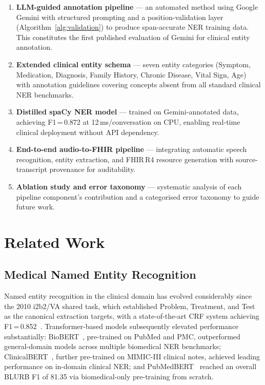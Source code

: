 \documentclass[conference]{IEEEtran}
\begin{document}
\begin{enumerate}
  \item \textbf{LLM-guided annotation pipeline} — an automated method using
  Google Gemini with structured prompting and a position-validation layer
  (Algorithm~\ref{alg:validation}) to produce span-accurate NER training data.
  This constitutes the first published evaluation of Gemini for clinical entity
  annotation.

  \item \textbf{Extended clinical entity schema} — seven entity categories
  (Symptom, Medication, Diagnosis, Family History, Chronic Disease, Vital Sign,
  Age) with annotation guidelines covering concepts absent from all standard
  clinical NER benchmarks.

  \item \textbf{Distilled spaCy NER model} — trained on Gemini-annotated data,
  achieving F1\,=\,0.872 at 12\,ms/conversation on CPU, enabling real-time
  clinical deployment without API dependency.

  \item \textbf{End-to-end audio-to-FHIR pipeline} — integrating automatic
  speech recognition, entity extraction, and FHIR\,R4 resource generation with
  source-transcript provenance for auditability.

  \item \textbf{Ablation study and error taxonomy} — systematic analysis of
  each pipeline component's contribution and a categorised error taxonomy to
  guide future work.
\end{enumerate}

\section{Related Work}
\label{sec:related}

\subsection{Medical Named Entity Recognition}

Named entity recognition in the clinical domain has evolved considerably since
the 2010 i2b2/VA shared task, which established Problem, Treatment, and Test
as the canonical extraction targets, with a state-of-the-art CRF system
achieving F1\,=\,0.852~\cite{uzuner2011}. Transformer-based models subsequently
elevated performance substantially: BioBERT~\cite{lee2020biobert}, pre-trained
on PubMed and PMC, outperformed general-domain models across multiple biomedical
NER benchmarks; ClinicalBERT~\cite{alsentzer2019clinicalbert}, further
pre-trained on MIMIC-III clinical notes, achieved leading performance on
in-domain clinical NER; and PubMedBERT~\cite{gu2021domain} reached an overall
BLURB F1 of 81.35 via biomedical-only pre-training from scratch.
\end{document}

